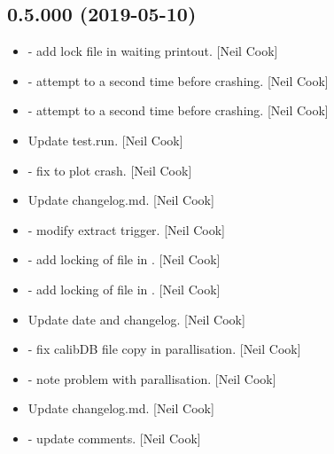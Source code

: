 \documentclass[a4paper,10pt,english]{report}
\begin{document}
\subsection{0.5.000 (2019-05-10)}
\label{\detokenize{misc/changelog:id137}}\begin{itemize}
\item {} 
 - add lock file in waiting printout. {[}Neil Cook{]}

\item {} 
 - attempt to  a second time before crashing.
{[}Neil Cook{]}

\item {} 
 - attempt to  a second time before crashing.
{[}Neil Cook{]}

\item {} 
Update test.run. {[}Neil Cook{]}

\item {} 
 - fix to plot crash. {[}Neil Cook{]}

\item {} 
Update changelog.md. {[}Neil Cook{]}

\item {} 
 - modify extract trigger. {[}Neil Cook{]}

\item {} 
 - add locking of file in . {[}Neil Cook{]}

\item {} 
 - add locking of file in . {[}Neil Cook{]}

\item {} 
Update date and changelog. {[}Neil Cook{]}

\item {} 
 - fix calibDB file copy in parallisation. {[}Neil Cook{]}

\item {} 
 - note problem with parallisation. {[}Neil Cook{]}

\item {} 
Update changelog.md. {[}Neil Cook{]}

\item {} 
 - update comments. {[}Neil Cook{]}


\end{itemize}
\end{document}
